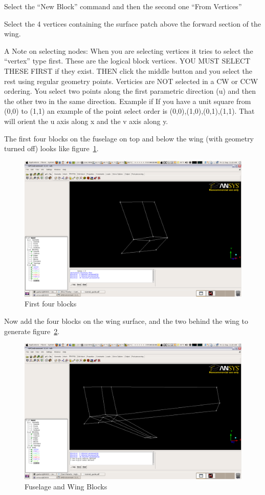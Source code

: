 \documentclass{report}
\begin{document}
Select the ``New Block'' command and then the second one ``From Vertices''

Select the 4 vertices containing the surface patch above the forward section of the wing. 

A Note on selecting nodes: When you are selecting vertices it tries to select the ``vertex'' type first. These are the logical block vertices.  YOU MUST SELECT THESE FIRST if they exist. THEN click the middle button and you select the rest using regular geometry points. Verticies are NOT selected in a CW or CCW ordering. You select two points along the first parametric direction (u) and then the other two in the same direction. Example if If you have a unit square from (0,0) to (1,1) an example of the point select order is (0,0),(1,0),(0,1),(1,1). That will orient the u axis along x and the v axis along y.

The first four blocks on the fuselage on top and below the wing (with geometry turned off) looks like figure~\ref{fig:four_blocks}.
\begin{figure}[htb]
  \centering
  \includegraphics[width=\textwidth,angle=0]{figures/fig9.png}
  \caption{First four blocks}
  \label{fig:four_blocks}
\end{figure}


Now add the four blocks on the wing surface, and the two behind the wing to generate figure~\ref{fig:more_blocks}.

\begin{figure}[htb]
  \centering
  \includegraphics[width=\textwidth,angle=0]{figures/fig10.png}
  \caption{Fuselage and Wing Blocks}
  \label{fig:more_blocks}
\end{figure}
\end{document}
